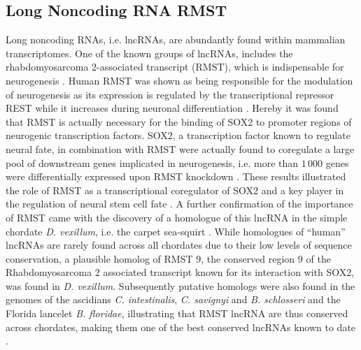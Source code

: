 \documentclass[graybox]{svmult}
\begin{document}
\subsection{Long Noncoding RNA RMST}
Long noncoding RNAs, i.e. lncRNAs, are abundantly found within mammalian 
transcriptomes. One of the known groups of lncRNAs, includes the 
rhabdomyosarcoma 2-associated transcript (RMST), which is indispensable for 
neurogenesis \cite{Bogu2013}. 
Human RMST was shown as being responsible for the modulation of neurogenesis as 
its expression is regulated by the transcriptional repressor REST while it 
increases during neuronal differentiation \cite{Bogu2013}. Hereby it was 
found that RMST is actually necessary for the binding of SOX2 to promoter 
regions of neurogenic transcription factors. SOX2, a transcription factor known 
to regulate neural fate, in combination with RMST were actually found to 
coregulate a large pool of downstream genes implicated in neurogenesis, i.e. 
more than $1\,000$ genes were differentially expressed upon RMST knockdown 
\cite{Bogu2013}. These results illustrated the role of RMST as a 
transcriptional coregulator of SOX2 and a key player in the regulation of 
neural stem cell fate \cite{Bogu2013}. A further confirmation of the importance 
of RMST came with the discovery of a homologue of this lncRNA in the simple 
chordate \textit{D. vexillum}, i.e. the carpet sea-squirt 
\cite{Velandia-Huerto2016}. While homologues of ``human'' lncRNAs are 
rarely found across all chordates due to their low levels of sequence 
conservation, a plausible homolog of RMST $9$, the conserved region $9$ of the 
Rhabdomyosarcoma 2 associated transcript known for its interaction with SOX2, 
was found in \textit{D. vexillum}. Subsequently putative homologs were also 
found in the genomes of the ascidians \textit{C. intestinalis}, \textit{C. 
savignyi} and \textit{B. schlosseri} and the Florida lancelet \textit{B. 
floridae}, illustrating that RMST lncRNA are thus conserved across chordates, 
making them one of the best conserved lncRNAs known to date 
\cite{Velandia-Huerto2016}.
\end{document}
